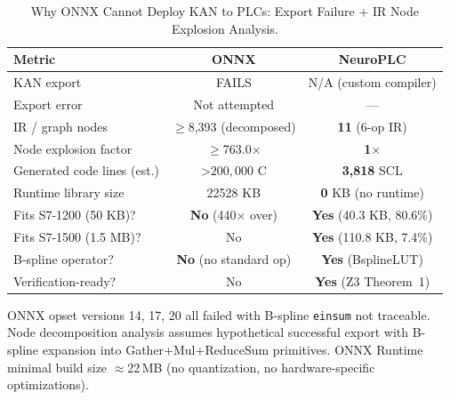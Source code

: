 \begin{table}[t]
\centering
\caption{Why ONNX Cannot Deploy KAN to PLCs: Export Failure + IR Node Explosion Analysis.}
\label{tab:onnx_failure}
\small
\begin{tabular}{@{}lcc@{}}
\toprule
\textbf{Metric} & \textbf{ONNX} & \textbf{NeuroPLC} \\
\midrule
KAN export & FAILS & N/A (custom compiler) \\
Export error & Not attempted & --- \\
IR / graph nodes & $\geq$8,393 (decomposed) & \textbf{11} (6-op IR) \\
Node explosion factor & $\geq$763.0$\times$ & \textbf{1$\times$} \\
Generated code lines (est.) & >$200,000$ C & \textbf{3,818} SCL \\
Runtime library size & 22528 KB & \textbf{0} KB (no runtime) \\
Fits S7-1200 (50 KB)? & \textbf{No} (440$\times$ over) & \textbf{Yes} (40.3 KB, 80.6\%) \\
Fits S7-1500 (1.5 MB)? & No & \textbf{Yes} (110.8 KB, 7.4\%) \\
B-spline operator? & \textbf{No} (no standard op) & \textbf{Yes} (BsplineLUT) \\
Verification-ready? & No & \textbf{Yes} (Z3 Theorem~1) \\
\bottomrule
\end{tabular}
\vspace{2pt}
{\scriptsize ONNX opset versions 14, 17, 20 all failed with B-spline \texttt{einsum} not traceable. Node decomposition analysis assumes hypothetical successful export with B-spline expansion into Gather+Mul+ReduceSum primitives. ONNX Runtime minimal build size $\approx$22\,MB (no quantization, no hardware-specific optimizations).}
\end{table}
